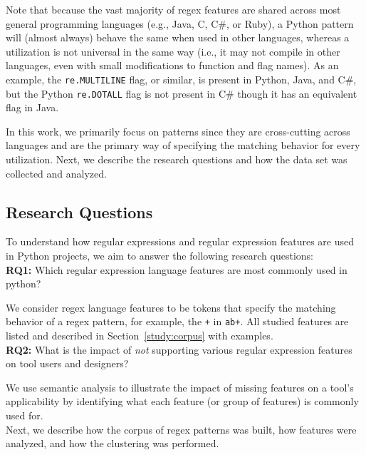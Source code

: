 Note that because the vast majority of regex features are shared across most general programming languages (e.g., Java, C, C\#, or Ruby), a Python {pattern} will (almost always) behave the same when used in other languages, whereas a utilization is not universal in the same way (i.e., it may not compile in other languages, even with small modifications to function and flag names).
As an example, the {\tt re.MULTILINE} flag, or similar, is present in Python, Java, and C\#, but  the Python {\tt re.DOTALL} flag is not present in C\# though it has an equivalent flag in Java.

In this work, we primarily focus on patterns since they are cross-cutting across languages and are the primary way of specifying the matching behavior for every utilization. Next, we describe the research questions and how the data set was collected and analyzed.

\subsection{Research Questions}
\label{sec:rqs}
To understand how regular expressions and regular expression features are used in Python projects, we aim to answer the following research questions:\\

\noindent \textbf{RQ1:} Which regular expression language features are most commonly used in python?

We consider regex language features to be tokens that specify the matching behavior of a regex pattern, for example,  the {\tt +} in {\tt ab+}.  All studied features are listed and described in Section~\ref{study:corpus} with examples.\\

\noindent \textbf{RQ2:} What is the impact of \emph{not} supporting various regular expression features on tool users and designers?

We use semantic analysis to illustrate the impact of missing features on a tool's applicability by identifying what each feature (or group of features) is commonly used for. \\


Next, we describe how the corpus of regex patterns was built, how features were analyzed, and how the clustering was performed.




